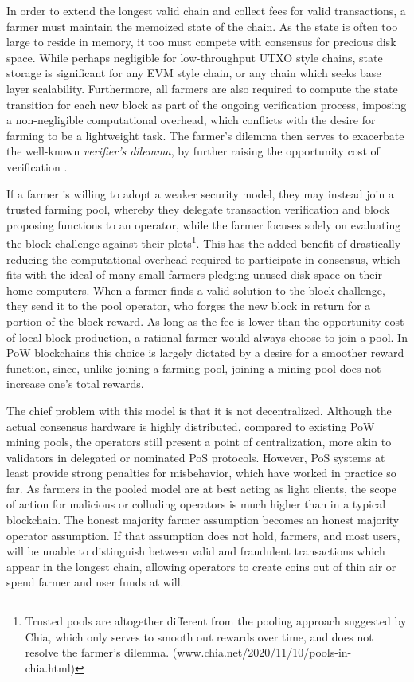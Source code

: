 \documentclass[conference]{IEEEtran}
\begin{document}
In order to extend the longest valid chain and collect fees for valid transactions, a farmer must maintain the memoized state of the chain. As the state is often too large to reside in memory, it too must compete with consensus for precious disk space. While perhaps negligible for low-throughput UTXO style chains, state storage is significant for any EVM style chain, or any chain which seeks base layer scalability. Furthermore, all farmers are also required to compute the state transition for each new block as part of the ongoing verification process, imposing a non-negligible computational overhead, which conflicts with the desire for farming to be a lightweight task. The farmer’s dilemma then serves to exacerbate the well-known \textit{verifier’s dilemma}, by further raising the opportunity cost of verification \cite{luu2015demystifying}. 

If a farmer is willing to adopt a weaker security model, they may instead join a trusted farming pool, whereby they delegate transaction verification and block proposing functions to an operator, while the farmer focuses solely on evaluating the block challenge against their plots\footnote{Trusted pools are altogether different from the pooling approach suggested by Chia, which only serves to smooth out rewards over time, and does not resolve the farmer's dilemma. (www.chia.net/2020/11/10/pools-in-chia.html)}. This has the added benefit of drastically reducing the computational overhead required to participate in consensus, which fits with the ideal of many small farmers pledging unused disk space on their home computers. When a farmer finds a valid solution to the block challenge, they send it to the pool operator, who forges the new block in return for a portion of the block reward. As long as the fee is lower than the opportunity cost of local block production, a rational farmer would always choose to join a pool. In PoW blockchains this choice is largely dictated by a desire for a smoother reward function, since, unlike joining a farming pool, joining a mining pool does not increase one’s total rewards.

The chief problem with this model is that it is not decentralized. Although the actual consensus hardware is highly distributed, compared to existing PoW mining pools, the operators still present a point of centralization, more akin to validators in delegated or nominated PoS protocols. However, PoS systems at least provide strong penalties for misbehavior, which have worked in practice so far. As farmers in the pooled model are at best acting as light clients, the scope of action for malicious or colluding operators is much higher than in a typical blockchain. The honest majority farmer assumption becomes an honest majority operator assumption. If that assumption does not hold, farmers, and most users, will be unable to distinguish between valid and fraudulent transactions which appear in the longest chain, allowing operators to create coins out of thin air or spend farmer and user funds at will.
\end{document}
